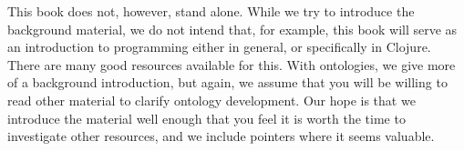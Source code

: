 This book does not, however, stand alone. While we try to introduce the
background material, we do not intend that, for example, this book will serve
as an introduction to programming either in general, or specifically in
Clojure. There are many good resources available for this. With
ontologies, we give more of a background introduction, but again, we assume
that you will be willing to read other material to clarify ontology
development. Our hope is that we introduce the material well enough that you
feel it is worth the time to investigate other resources, and we include
pointers where it seems valuable.




